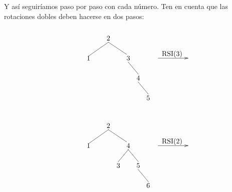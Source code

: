 \documentclass[10pt,a4paper,spanish]{report}
\begin{document}
\noindent
Y así seguiríamos paso por paso con cada número. Ten en cuenta que las rotaciones dobles deben hacerse en dos pasos:

\begin{minipage}{0.5\textwidth}
\[\begin{xy}
,(32,-8)*+=<20mm>[]\txt<2cm>{RSI(3)}
,(0,0)*+=<10mm>[]\txt<2cm>{2}
,(-10,-10)*+=<10mm>[]\txt<2cm>{1}
,(10,-10)*+=<10mm>[]\txt<2cm>{3}
,(15,-20)*+=<10mm>[]\txt<2cm>{4}
,(20,-30)*+=<10mm>[]\txt<2cm>{5}

\ar@{->} (25,-10);(40,-10)
\ar@{-} (0,-2);(-10,-9) %
\ar@{-} (0,-2);(9,-8) %
\ar@{-} (10,-12);(15,-18) %
\ar@{-} (15,-22);(20,-28)
\end{xy}\]
\end{minipage}
\begin{minipage}{0.5\textwidth}
\[\begin{xy}
,(32,-8)*+=<20mm>[]\txt<2cm>{RSI(2)}
,(0,0)*+=<10mm>[]\txt<2cm>{2}
,(-10,-10)*+=<10mm>[]\txt<2cm>{1}
,(10,-10)*+=<10mm>[]\txt<2cm>{4}
,(5,-20)*+=<10mm>[]\txt<2cm>{3}
,(15,-20)*+=<10mm>[]\txt<2cm>{5}
,(20,-30)*+=<10mm>[]\txt<2cm>{6}

\ar@{->} (25,-10);(40,-10)
\ar@{-} (0,-2);(-10,-9) %
\ar@{-} (0,-2);(9,-8) %
\ar@{-} (10,-12);(5,-18) %
\ar@{-} (10,-12);(15,-18) %
\ar@{-} (15,-22);(20,-28)
\end{xy}\]
\end{minipage}
\end{document}
